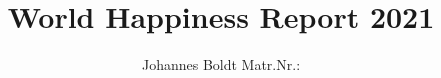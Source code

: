 \subject{Projektbericht zum Modul Information Retrieval und Visualisierung Sommersemester 2022}
\title{World Happiness Report 2021}
\author{Johannes Boldt Matr.Nr.:}%
\date{}
\maketitle%
\clearpage

